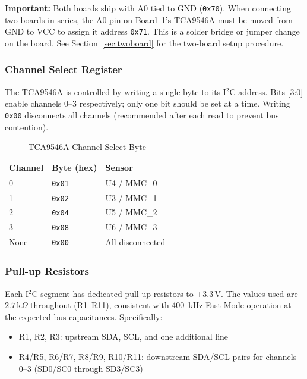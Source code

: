 \documentclass[12pt]{article}
\begin{document}
\textbf{Important:} Both boards ship with A0 tied to GND (\texttt{0x70}).
When connecting two boards in series, the A0 pin on Board~1's TCA9546A
must be moved from GND to VCC to assign it address \texttt{0x71}. This
is a solder bridge or jumper change on the board. See
Section~\ref{sec:twoboard} for the two-board setup procedure.

\subsubsection{Channel Select Register}

The TCA9546A is controlled by writing a single byte to its I$^2$C address.
Bits [3:0] enable channels 0--3 respectively; only one bit should be set
at a time. Writing \texttt{0x00} disconnects all channels (recommended
after each read to prevent bus contention).

\begin{table}[H]
  \centering
  \caption{TCA9546A Channel Select Byte}
  \begin{tabular}{lll}
    \toprule
    \textbf{Channel} & \textbf{Byte (hex)} & \textbf{Sensor} \\
    \midrule
    0 & \texttt{0x01} & U4 / MMC\_0 \\
    1 & \texttt{0x02} & U3 / MMC\_1 \\
    2 & \texttt{0x04} & U5 / MMC\_2 \\
    3 & \texttt{0x08} & U6 / MMC\_3 \\
    None & \texttt{0x00} & All disconnected \\
    \bottomrule
  \end{tabular}
  \label{tab:tca_select}
\end{table}

\subsubsection{Pull-up Resistors}

Each I$^2$C segment has dedicated pull-up resistors to +3.3\,V. The values
used are $2.7\,\text{k}\Omega$ throughout (R1--R11), consistent with
\SI{400}{\kilo\hertz} Fast-Mode operation at the expected bus capacitances.
Specifically:

\begin{itemize}
  \item R1, R2, R3: upstream SDA, SCL, and one additional line
  \item R4/R5, R6/R7, R8/R9, R10/R11: downstream SDA/SCL pairs for
        channels 0--3 (SD0/SC0 through SD3/SC3)
\end{itemize}
\end{document}
